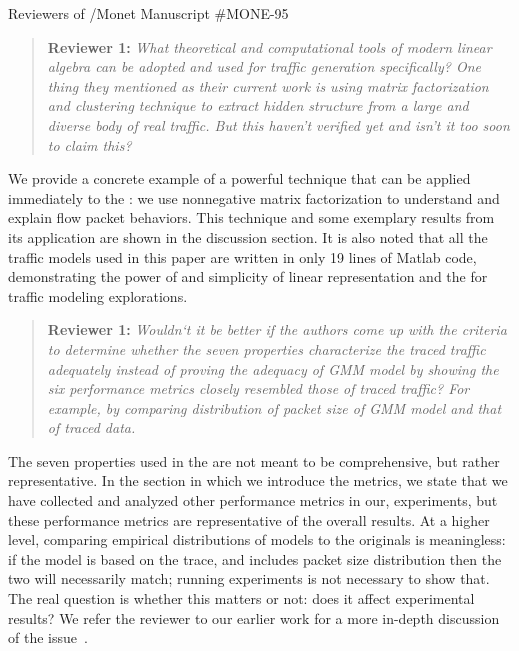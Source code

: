 \documentclass{letter}
\newenvironment{reviewer}[1]%
{\begin{quote}\textbf{Reviewer #1:} \it}{\end{quote}}
\begin{document}
\begin{letter}{Reviewers of /Monet Manuscript \#MONE-95}
\begin{reviewer}{1}
What theoretical and computational tools of modern linear algebra can be adopted and used for traffic generation specifically? One thing they mentioned as their current work is using matrix factorization and clustering technique to extract hidden structure from a large and diverse body of real traffic. But this haven’t verified yet and isn’t it too soon to claim this?
\end{reviewer}
We provide a concrete example of a powerful technique that can be applied immediately to the : we use nonnegative matrix factorization to understand and explain flow packet behaviors.
This technique and some exemplary results from its application are shown in the discussion section.
It is also noted that all the traffic models used in this paper are written in only 19 lines of Matlab code, demonstrating the power of and simplicity of linear representation and the  for traffic modeling explorations.

\begin{reviewer}{1}
Wouldn‘t it be better if the authors come up with the criteria to determine whether the seven properties characterize the traced traffic adequately instead of proving the adequacy of GMM model by showing the six performance metrics closely resembled those of traced traffic? For example, by comparing distribution of packet size of GMM model and that of traced data.
\end{reviewer}
The seven properties used in the  are not meant to be comprehensive, but rather representative.
In the section in which we introduce the metrics, we state that we have collected and analyzed other performance metrics in our, experiments, but these performance metrics are representative of the overall results.
At a higher level, comparing empirical distributions of models to the originals is meaningless:
if the model is based on the trace, and includes packet size distribution then the two will necessarily match;
running experiments is not necessary to show that.
The real question is whether this matters or not:
does it affect experimental results?
We refer the reviewer to our earlier work for a more in-depth discussion of the issue~\cite{Karpinski07:realism,Karpinski07:cbr-failure}.


\end{letter}
\end{document}
